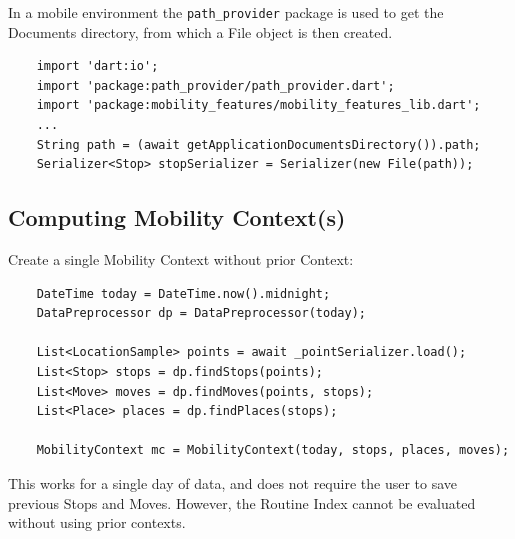 In a mobile environment the \verb|path_provider| package is used to get the Documents directory, from which a File object is then created.

\begin{verbatim}
    import 'dart:io';
    import 'package:path_provider/path_provider.dart';
    import 'package:mobility_features/mobility_features_lib.dart';
    ...
    String path = (await getApplicationDocumentsDirectory()).path;
    Serializer<Stop> stopSerializer = Serializer(new File(path));
\end{verbatim}

\subsection{Computing Mobility Context(s)}
Create a single Mobility Context without prior Context:

\begin{verbatim}
    DateTime today = DateTime.now().midnight;
    DataPreprocessor dp = DataPreprocessor(today);

    List<LocationSample> points = await _pointSerializer.load();
    List<Stop> stops = dp.findStops(points);
    List<Move> moves = dp.findMoves(points, stops);
    List<Place> places = dp.findPlaces(stops);
    
    MobilityContext mc = MobilityContext(today, stops, places, moves);
\end{verbatim}

This works for a single day of data, and does not require the user to save previous Stops and Moves. However, the Routine Index cannot be evaluated without using prior contexts. 


    
    
